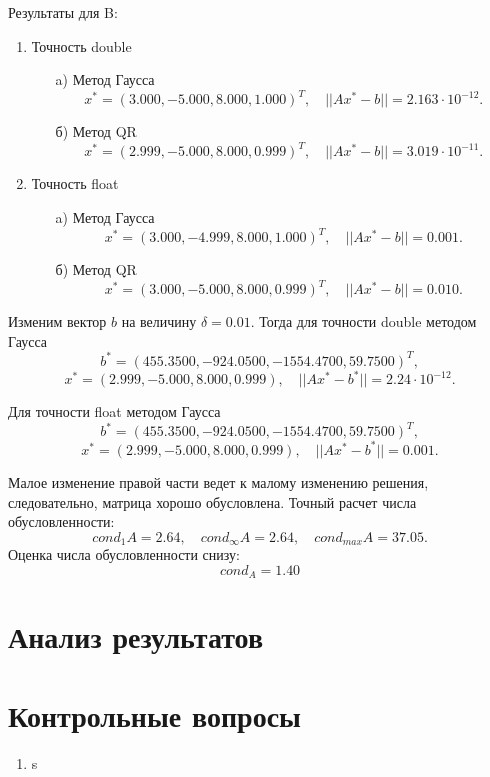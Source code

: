 \documentclass[12pt, a4paper]{article}
\begin{document}
Результаты для B:
\begin{enumerate}
\item Точность double
	\begin{enumerate}
	\item[a)] Метод Гаусса
	$$x^* = (3{.}000 , -5{.}000, 8{.}000 ,1{.}000)^{T},\quad ||Ax^{*}-b|| = 2{.}163\cdot10^{-12}.$$
	\item[б)] Метод QR
	$$x^* = (2{.}999 , -5{.}000, 8{.}000 ,0{.}999)^{T},\quad ||Ax^{*}-b|| = 3{.}019\cdot10^{-11}.$$
	\end{enumerate}
\item Точность float
	\begin{enumerate}
	\item[a)] Метод Гаусса
	$$x^* = (3{.}000 , -4{.}999, 8{.}000, 1{.}000)^{T},\quad ||Ax^{*}-b|| = 0{.}001.$$
	\item[б)] Метод QR
	$$x^* = (3{.}000 , -5{.}000, 8{.}000, 0{.}999)^{T},\quad ||Ax^{*}-b|| = 0{.}010.$$
	\end{enumerate}
\end{enumerate}
Изменим вектор $b$ на величину $\delta = 0.01$. Тогда для точности double методом Гаусса
$$b^* = (455.3500, -924{.}0500, -1554{.}4700, 59{.}7500)^T,$$
$$x^* = (2{.}999, -5{.}000, 8{.}000, 0{.}999), \quad ||Ax^{*}-b^*|| =  2{.}24\cdot10^{-12}.$$

Для точности float методом Гаусса
$$b^* = (455.3500, -924{.}0500, -1554{.}4700, 59{.}7500)^T,$$
$$x^* = (2{.}999, -5{.}000, 8{.}000, 0{.}999), \quad ||Ax^{*}-b^*|| =  0{.}001.$$

Малое изменение правой части ведет к малому изменению решения, следовательно, матрица хорошо обусловлена. Точный расчет числа обусловленности: 
$$cond_1A = 2{.}64,\quad cond_{\infty}A = 2{.}64, \quad cond_{max}A = 37{.}05.$$
Оценка числа обусловленности снизу:
$$cond_A = 1{.}40$$
\newpage

\section{Анализ результатов}


\newpage

\section{Контрольные вопросы}
\begin{enumerate}

\item s
\end{enumerate}
\newpage
\end{document}
